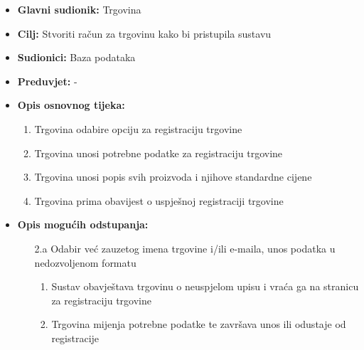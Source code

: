                        \noindent {}
					\begin{itemize}
	
						\item \textbf{Glavni sudionik: }Trgovina
						\item  \textbf{Cilj:} Stvoriti račun za trgovinu kako bi pristupila sustavu
						\item  \textbf{Sudionici:} Baza podataka
						\item  \textbf{Preduvjet:} -
						\item  \textbf{Opis osnovnog tijeka:}
						
						\item[] \begin{enumerate}
							\item Trgovina odabire opciju za registraciju trgovine
                                \item Trgovina unosi potrebne podatke za registraciju trgovine
                                \item Trgovina unosi popis svih proizvoda i njihove standardne cijene
                                \item Trgovina prima obavijest o uspješnoj registraciji trgovine
						\end{enumerate}

                            \item  \textbf{Opis mogućih odstupanja:}
						
						\item[] \begin{enumerate}
	
							\item[2.a] Odabir već zauzetog imena trgovine i/ili e-maila, unos podatka u nedozvoljenom formatu
							\item[] \begin{enumerate}
								
								\item Sustav obavještava trgovinu o neuspjelom upisu i vraća ga na stranicu za registraciju trgovine
								\item Trgovina mijenja potrebne podatke te završava unos ili odustaje od registracije\\
								
							\end{enumerate}
			
							
						\end{enumerate}
						
					\end{itemize}

